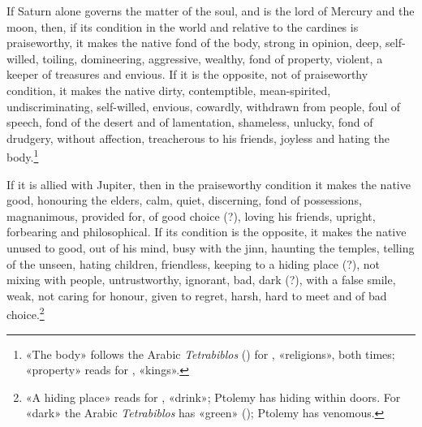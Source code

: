 \documentclass[11pt]{article}
\begin{document}
\par If Saturn alone governs the matter of the soul, and is the lord of Mercury and the moon, then, if its condition in the world and relative to the cardines is praiseworthy, it makes the native fond of the body, strong in opinion, deep, self-willed, toiling, domineering, aggressive, wealthy, fond of property, violent, a keeper of treasures and envious. If it is the opposite, not of praiseworthy condition, it makes the native dirty, contemptible, mean-spirited, undiscriminating, self-willed, envious, cowardly, withdrawn from people, foul of speech, fond of the desert and of lamentation, shameless, unlucky, fond of drudgery, without affection, treacherous to his friends, joyless and hating the body.\footnote{«The body» follows the Arabic \emph{Tetrabiblos} () for , «religions», both times; «property» reads  for , «kings».}\par
\par If it is allied with Jupiter, then in the praiseworthy condition it makes the native good, honouring the elders, calm, quiet, discerning, fond of possessions, magnanimous, provided for, of good choice (?), loving his friends, upright, forbearing and philosophical. If its condition is the opposite, it makes the native unused to good, out of his mind, busy with the jinn, haunting the temples, telling of the unseen, hating children, friendless, keeping to a hiding place (?), not mixing with people, untrustworthy, ignorant, bad, dark (?), with a false smile, weak, not caring for honour, given to regret, harsh, hard to meet and of bad choice.\footnote{«A hiding place» reads  for , «drink»; Ptolemy has hiding within doors. For «dark» the Arabic \emph{Tetrabiblos} has «green» (); Ptolemy has venomous.}\par
\end{document}
